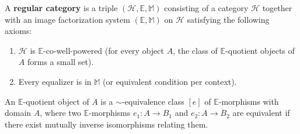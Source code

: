 A \textbf{regular category} is a triple $(\mathcal{H}, \mathbb{E}, \mathbb{M})$ consisting of a category $\mathcal{H}$ together with an image factorization system $(\mathbb{E}, \mathbb{M})$ on $\mathcal{H}$ satisfying the following axioms:

\begin{enumerate}
  \item $\mathcal{H}$ is $\mathbb{E}$-co-well-powered (for every object $A$, the class of $\mathbb{E}$-quotient objects of $A$ forms a small set).
  \item Every equalizer is in $\mathbb{M}$ (or equivalent condition per context).
\end{enumerate}

An $\mathbb{E}$-quotient object of $A$ is a $\sim$-equivalence class $[e]$ of $\mathbb{E}$-morphisms with domain $A$, where two $\mathbb{E}$-morphisms $e_1: A \longrightarrow B_1$ and $e_2: A \longrightarrow B_2$ are equivalent if there exist mutually inverse isomorphisms relating them.
